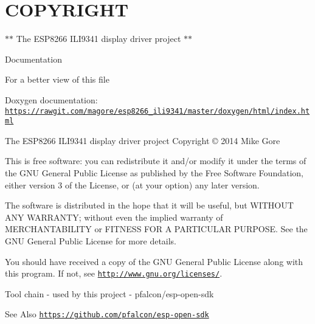 \hypertarget{md_COPYRIGHT_COPYRIGHT}{}\section{C\-O\-P\-Y\-R\-I\-G\-H\-T}\label{md_COPYRIGHT_COPYRIGHT}
$\ast$$\ast$ The E\-S\-P8266 I\-L\-I9341 display driver project $\ast$$\ast$

\begin{DoxyParagraph}{Documentation}

\begin{DoxyItemize}
\item For a better view of this file
\item Doxygen documentation\-: \href{https://rawgit.com/magore/esp8266_ili9341/master/doxygen/html/index.html}{\tt https\-://rawgit.\-com/magore/esp8266\-\_\-ili9341/master/doxygen/html/index.\-html}
\end{DoxyItemize}
\end{DoxyParagraph}
\begin{DoxyParagraph}{The E\-S\-P8266 I\-L\-I9341 display driver project Copyright \copyright{} 2014 Mike Gore}

\end{DoxyParagraph}
This is free software\-: you can redistribute it and/or modify it under the terms of the G\-N\-U General Public License as published by the Free Software Foundation, either version 3 of the License, or (at your option) any later version.

The software is distributed in the hope that it will be useful, but W\-I\-T\-H\-O\-U\-T A\-N\-Y W\-A\-R\-R\-A\-N\-T\-Y; without even the implied warranty of M\-E\-R\-C\-H\-A\-N\-T\-A\-B\-I\-L\-I\-T\-Y or F\-I\-T\-N\-E\-S\-S F\-O\-R A P\-A\-R\-T\-I\-C\-U\-L\-A\-R P\-U\-R\-P\-O\-S\-E. See the G\-N\-U General Public License for more details.

You should have received a copy of the G\-N\-U General Public License along with this program. If not, see \href{http://www.gnu.org/licenses/}{\tt http\-://www.\-gnu.\-org/licenses/}.



 \begin{DoxyParagraph}{Tool chain -\/ used by this project -\/ pfalcon/esp-\/open-\/sdk }

\end{DoxyParagraph}
\begin{DoxySeeAlso}{See Also}
\href{https://github.com/pfalcon/esp-open-sdk}{\tt https\-://github.\-com/pfalcon/esp-\/open-\/sdk}
\end{DoxySeeAlso}


